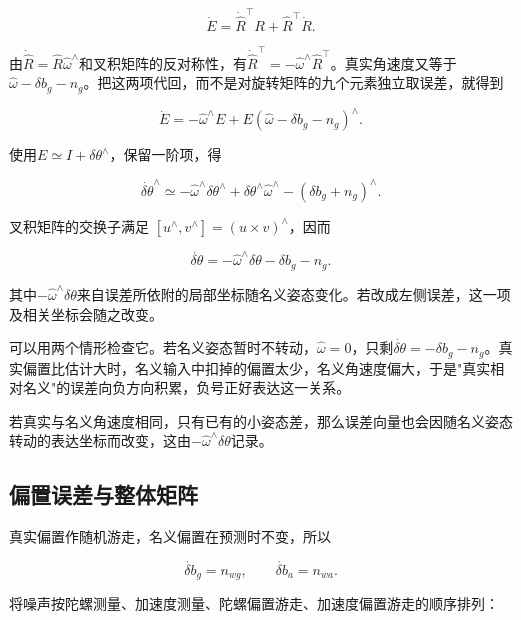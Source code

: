 \begin{equation*}
\dot E=\dot{\hat R}^{\top}R+\hat R^\top\dot R.
\end{equation*}

由$\dot{\hat R}=\hat R\hat\omega^\wedge$和叉积矩阵的反对称性，有$\dot{\hat R}^{\top}=-\hat\omega^\wedge\hat R^\top$。真实角速度又等于$\hat\omega-\delta b_g-n_g$。把这两项代回，而不是对旋转矩阵的九个元素独立取误差，就得到

\begin{equation*}
\dot E=-\hat\omega^\wedge E
          +E(\hat\omega-\delta b_g-n_g)^\wedge.
\end{equation*}

使用$E\simeq I+\delta\theta^\wedge$，保留一阶项，得

\begin{equation*}
\dot{\delta\theta}^{\wedge}
 \simeq-\hat\omega^\wedge\delta\theta^\wedge
       +\delta\theta^\wedge\hat\omega^\wedge
       -(\delta b_g+n_g)^\wedge.
\end{equation*}

叉积矩阵的交换子满足 $[u^\wedge,v^\wedge]=(u\times v)^\wedge$，因而

\begin{equation*}
\boxed{\dot{\delta\theta}
       =-\hat\omega^\wedge\delta\theta-\delta b_g-n_g.}
\end{equation*}

其中$-\hat\omega^\wedge\delta\theta$来自误差所依附的局部坐标随名义姿态变化。若改成左侧误差，这一项及相关坐标会随之改变。

可以用两个情形检查它。若名义姿态暂时不转动，$\hat\omega=0$，只剩$\dot{\delta\theta}=-\delta b_g-n_g$。真实偏置比估计大时，名义输入中扣掉的偏置太少，名义角速度偏大，于是"真实相对名义"的误差向负方向积累，负号正好表达这一关系。

若真实与名义角速度相同，只有已有的小姿态差，那么误差向量也会因随名义姿态转动的表达坐标而改变，这由$-\hat\omega^\wedge\delta\theta$记录。

\subsection{偏置误差与整体矩阵}

真实偏置作随机游走，名义偏置在预测时不变，所以

\begin{equation*}
\dot{\delta b}_g=n_{wg},\qquad\dot{\delta b}_a=n_{wa}.
\end{equation*}

将噪声按陀螺测量、加速度测量、陀螺偏置游走、加速度偏置游走的顺序排列：

